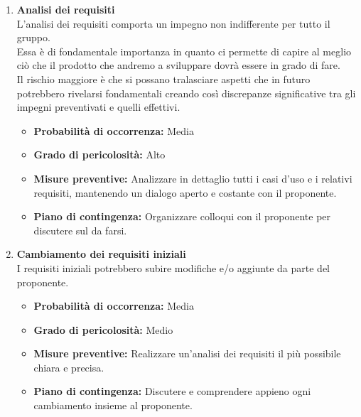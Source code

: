 \begin{enumerate}
    \item \textbf{Analisi dei requisiti}\\
    L'analisi dei requisiti comporta un impegno non indifferente per tutto il gruppo.\\
    Essa è di fondamentale importanza in quanto ci permette di capire al meglio ciò che il prodotto che andremo a sviluppare dovrà essere in grado di fare.\\
    Il rischio maggiore è che si possano tralasciare aspetti che in futuro potrebbero rivelarsi fondamentali creando così discrepanze significative tra gli impegni preventivati e quelli effettivi.
    \begin{itemize}
        \item \textbf{Probabilità di occorrenza:} Media
        \item \textbf{Grado di pericolosità:} Alto
        \item \textbf{Misure preventive:} Analizzare in dettaglio tutti i casi d’uso e i relativi requisiti, mantenendo un dialogo aperto e costante con il proponente.
        \item \textbf{Piano di contingenza:} Organizzare colloqui con il proponente per discutere sul da farsi.
    \end{itemize}

    \item \textbf{Cambiamento dei requisiti iniziali}\\
    I requisiti iniziali potrebbero subire modifiche e/o aggiunte da parte del proponente.
    \begin{itemize}
        \item \textbf{Probabilità di occorrenza:} Media
        \item \textbf{Grado di pericolosità:} Medio
        \item \textbf{Misure preventive:} Realizzare un'analisi dei requisiti il più possibile chiara e precisa. 
        \item \textbf{Piano di contingenza:} Discutere e comprendere appieno ogni cambiamento insieme al proponente.
    \end{itemize}
\end{enumerate}


